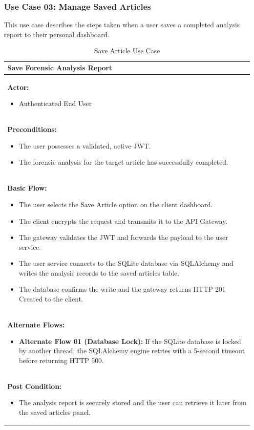 \subsubsection{Use Case 03: Manage Saved Articles}
This use case describes the steps taken when a user saves a completed analysis report to their personal dashboard.
\begin{table}[H]
    \renewcommand{\arraystretch}{1.3}
    \begin{tabularx}{\textwidth}{| X |}
        \hline
        \textbf{Save Forensic Analysis Report} \\
        \hline
        \textbf{Actor:}
        \begin{itemize}
            \item Authenticated End User
        \end{itemize} \\
        \hline
        \textbf{Preconditions:}
        \begin{itemize}
            \item The user possesses a validated, active JWT.
            \item The forensic analysis for the target article has successfully completed.
        \end{itemize} \\
        \hline
        \textbf{Basic Flow:}
        \begin{itemize}
            \item The user selects the Save Article option on the client dashboard.
            \item The client encrypts the request and transmits it to the API Gateway.
            \item The gateway validates the JWT and forwards the payload to the user service.
            \item The user service connects to the SQLite database via SQLAlchemy and writes the analysis records to the saved articles table.
            \item The database confirms the write and the gateway returns HTTP 201 Created to the client.
        \end{itemize} \\
        \hline
        \textbf{Alternate Flows:}
        \begin{itemize}
            \item \textbf{Alternate Flow 01 (Database Lock):} If the SQLite database is locked by another thread, the SQLAlchemy engine retries with a 5-second timeout before returning HTTP 500.
        \end{itemize} \\
        \hline
        \textbf{Post Condition:}
        \begin{itemize}
            \item The analysis report is securely stored and the user can retrieve it later from the saved articles panel.
        \end{itemize} \\
        \hline
    \end{tabularx}
    \caption{Save Article Use Case}
    \label{tab:save_article_use_case}
\end{table}

